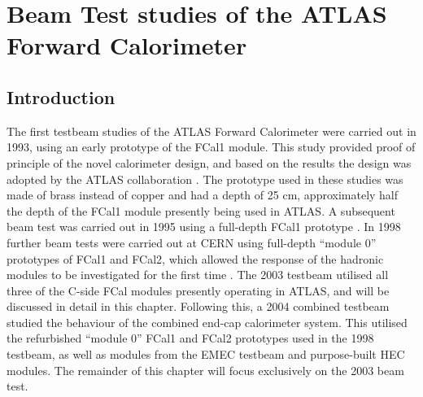 





%
%
%
% 







\chapter{Beam Test studies of the ATLAS Forward Calorimeter}
\label{chapTB}
\section{Introduction}






The first testbeam studies of the ATLAS Forward Calorimeter were carried out in 1993, using an early prototype of the FCal1 module\cite{TB93_prototype}. This study provided proof of principle of the novel calorimeter design, and based on the results the design was adopted by the ATLAS collaboration \cite{TB93_prototype}. The prototype used in these studies was made of brass instead of copper and had a depth of 25 cm, approximately half the depth of the FCal1 module presently being used in ATLAS. A subsequent beam test was carried out in 1995 using a full-depth FCal1 prototype \cite{TB95_prototype}. In 1998 further beam tests were carried out at CERN using full-depth ``module 0'' prototypes of FCal1 and FCal2, which allowed the response of the hadronic modules to be investigated for the first time \cite{TB98_testbeam_results,TB98_electron_signals}. The 2003 testbeam utilised all three of the C-side FCal modules presently operating in ATLAS, and will be discussed in detail in this chapter. Following this, a 2004 combined testbeam studied the behaviour of the combined end-cap calorimeter system\cite{TB2004pub}. This utilised the refurbished ``module 0'' FCal1 and FCal2 prototypes used in the 1998 testbeam, as well as modules from the EMEC testbeam \cite{EMECTB1,EMECTB2} and purpose-built HEC modules. The remainder of this chapter will focus exclusively on the 2003 beam test.
%
%

